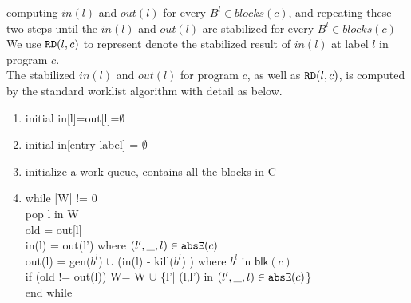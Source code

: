 computing $in(l)$ and $out(l)$ for every $B^l \in blocks(c) $, and repeating these two steps
until the $in(l)$ and $out(l)$ are stabilized for every $B^l \in blocks(c) $
We use $\mathtt{RD}(l,c)$ to represent 
denote the stabilized result of $in(l)$ at label $l$ in program $c$. 
\\
The stabilized $in(l)$ and $out(l)$ for program $c$, as well as $\mathtt{RD}(l, c)$,
is computed by the standard worklist algorithm with detail as below. 
\begin{enumerate}
    \item initial in[l]=out[l]=$\emptyset$
    \item initial in[entry label] = $\emptyset$
    \item initialize a work queue, contains all the blocks in C
    \item while |W| != 0 \\
         pop l in W\\
          old = out[l]\\
          in(l) =  out(l') where $(l',\_, l) \in \mathtt{abs}{\mathtt{E}}(c)$\\
           out(l) = gen($b^l$) $\cup$ (in(l) - kill($b^l$) ) where $b^l$ in $\mathsf{blk}(c)$   \\
          if (old != out(l)) W= W $\cup$ \{l'| (l,l') in $(l',\_, l) \in \mathtt{abs}{\mathtt{E}}(c)$\}\\
          end while
\end{enumerate}
%
